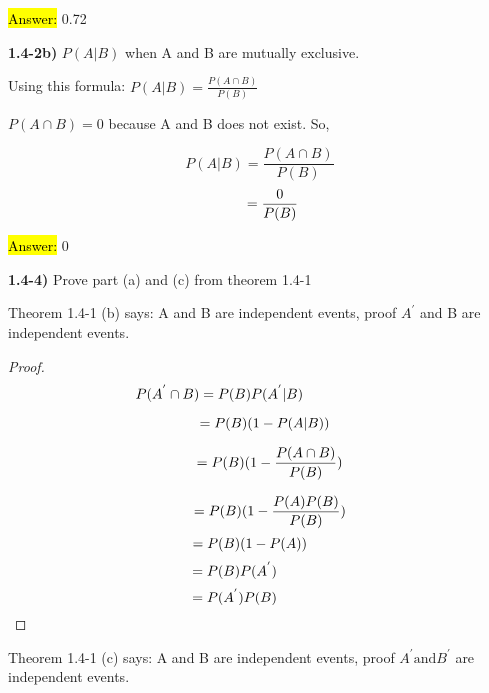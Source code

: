 \documentclass{article}
\begin{document}
\hl{Answer:} 0.72

\vspace{3mm}

\textbf{1.4-2b)} $P(A | B)$ when A and B are mutually exclusive.
\vspace{3mm}

Using this formula: $P(A|B)=\frac{P(A \cap B)}{P(B)}$ 
\vspace{3mm}

$P(A \cap B)=0$ because A and B does not exist. So,

$$P(A|B)=\frac{P(A \cap B)}{P(B)}$$
$$\hspace{.25in}=\frac{0}{P(B)}$$

\hl{Answer:} 0


\newpage

\textbf{1.4-4)} Prove part (a) and (c) from theorem 1.4-1

Theorem 1.4-1 (b) says: A and B are independent events, proof $A^{'}$ and B are independent events.

\begin{proof}



 $$\hspace{-.8in}P(A^{'}\cap B)=P(B)P(A^{'} | B)$$

 
$$\hspace{.1in}=P(B)(1-P(A | B)) $$


$$\hspace{.2in}=P(B)(1-\frac{P(A\cap B)}{P(B)})$$


$$\hspace{.2in}=P(B)(1-\frac{P(A)P( B)}{P(B)}) $$
$$\hspace{-.2in}=P(B)(1-P(A))$$
$$\hspace{-.5in}=P(B)P(A^{'})$$
$$\hspace{-.5in}=P(A^{'})P(B)$$
\end{proof}

\vspace{2mm}

Theorem 1.4-1 (c) says: A and B are independent events, proof $A^{'} \text{and} B^{'}$ are independent events.
\end{document}

